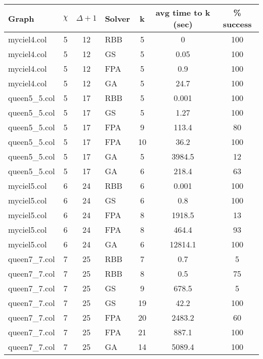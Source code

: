\begin{table}[H]
\label{results1}
\centering
\begin{tabular}{|l c c l c c c|}
\hline
Graph & $\chi$ & $\Delta + 1$ & Solver & k & avg time to k (sec)& \% success\\ \hline

myciel4.col    & 5  & 12  & RBB & 5 & 0 & 100\\
myciel4.col    & 5  & 12  & GS  & 5 & 0.05 & 100\\
myciel4.col    & 5  & 12  & FPA & 5 & 0.9 & 100\\
myciel4.col    & 5  & 12  & GA  & 5 & 24.7 & 100\\ \hline

queen5\_5.col  & 5  & 17  & RBB & 5 & 0.001 & 100\\
queen5\_5.col  & 5  & 17  & GS  & 5 & 1.27 & 100\\
queen5\_5.col  & 5  & 17  & FPA & 9 & 113.4 & 80\\
queen5\_5.col  & 5  & 17  & FPA & 10 & 36.2 & 100\\
queen5\_5.col  & 5  & 17  & GA  & 5 & 3984.5 & 12\\
queen5\_5.col  & 5  & 17  & GA  & 6 & 218.4 & 63\\ \hline

myciel5.col    & 6  & 24  & RBB & 6 & 0.001 & 100\\
myciel5.col    & 6  & 24  & GS  & 6 & 0.8 & 100\\
myciel5.col    & 6  & 24  & FPA & 8 & 1918.5 & 13\\
myciel5.col    & 6  & 24  & FPA & 8 & 464.4 & 93\\
myciel5.col    & 6  & 24  & GA  & 6 & 12814.1 & 100\\ \hline

queen7\_7.col  & 7  & 25  & RBB & 7 & 0.7 & 5\\
queen7\_7.col  & 7  & 25  & RBB & 8 & 0.5 & 75\\
queen7\_7.col  & 7  & 25  & GS  & 9 & 678.5 & 5\\
queen7\_7.col  & 7  & 25  & GS  & 19 & 42.2 & 100\\
queen7\_7.col  & 7  & 25  & FPA & 20 & 2483.2 & 60\\
queen7\_7.col  & 7  & 25  & FPA & 21 & 887.1 & 100\\
queen7\_7.col  & 7  & 25  & GA  & 14 & 5089.4 & 100\\ \hline


\end{tabular}
\end{table}
